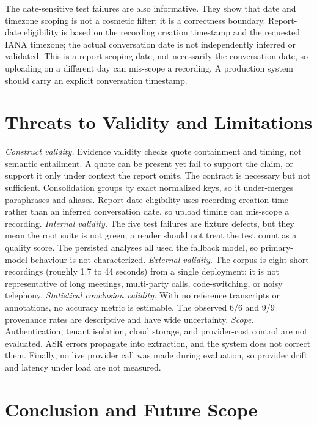 \documentclass[conference,a4paper]{IEEEtran}
\begin{document}
The date-sensitive test failures are also informative. They show that date and timezone
scoping is not a cosmetic filter; it is a correctness boundary. Report-date eligibility is
based on the recording creation timestamp and the requested IANA timezone; the actual
conversation date is not independently inferred or validated. This is a report-scoping
date, not necessarily the conversation date, so uploading on a different day can mis-scope
a recording. A production system should carry an explicit conversation timestamp.

\section{Threats to Validity and Limitations}
\label{sec:threats}

\emph{Construct validity.} Evidence validity checks quote containment and timing, not
semantic entailment. A quote can be present yet fail to support the claim, or support it
only under context the report omits. The contract is necessary but not sufficient.
Consolidation groups by exact normalized keys, so it under-merges paraphrases and aliases.
Report-date eligibility uses recording creation time rather than an inferred conversation
date, so upload timing can mis-scope a recording.
\emph{Internal validity.} The five test failures are fixture defects, but they mean the
root suite is not green; a reader should not treat the test count as a quality score. The
persisted analyses all used the fallback model, so primary-model behaviour is not
characterized. \emph{External validity.} The corpus is eight short recordings (roughly 1.7
to 44 seconds) from a single deployment; it is not representative of long meetings,
multi-party calls, code-switching, or noisy telephony. \emph{Statistical conclusion
validity.} With no reference transcripts or annotations, no accuracy metric is estimable.
The observed 6/6 and 9/9 provenance rates are descriptive and have wide uncertainty.
\emph{Scope.} Authentication, tenant isolation, cloud storage, and provider-cost control
are not evaluated. ASR errors propagate into extraction, and the system does not correct
them. Finally, no live provider call was made during evaluation, so provider drift and
latency under load are not measured.

\section{Conclusion and Future Scope}
\end{document}
